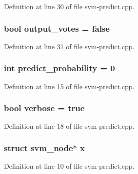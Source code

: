 Definition at line 30 of file svm-\/predict.\-cpp.

\hypertarget{_2svm-predict_8cpp_ac3602f56435c68a322553ed33804e5d1}{
\subsubsection[{output\-\_\-votes}]{\setlength{\rightskip}{0pt plus 5cm}bool output\-\_\-votes = false}}\label{_2svm-predict_8cpp_ac3602f56435c68a322553ed33804e5d1}


Definition at line 31 of file svm-\/predict.\-cpp.

\hypertarget{_2svm-predict_8cpp_a1501132f5226b295e5300d74da55a2b9}{
\subsubsection[{predict\-\_\-probability}]{\setlength{\rightskip}{0pt plus 5cm}int predict\-\_\-probability = 0}}\label{_2svm-predict_8cpp_a1501132f5226b295e5300d74da55a2b9}


Definition at line 15 of file svm-\/predict.\-cpp.

\hypertarget{_2svm-predict_8cpp_ab3f078684998b83967d507d0f453f454}{
\subsubsection[{verbose}]{\setlength{\rightskip}{0pt plus 5cm}bool verbose = true}}\label{_2svm-predict_8cpp_ab3f078684998b83967d507d0f453f454}


Definition at line 18 of file svm-\/predict.\-cpp.

\hypertarget{_2svm-predict_8cpp_a9a5b72a4065074cac5da07efb80a1e79}{
\subsubsection[{x}]{\setlength{\rightskip}{0pt plus 5cm}struct {\bf svm\-\_\-node}$\ast$ x}}\label{_2svm-predict_8cpp_a9a5b72a4065074cac5da07efb80a1e79}


Definition at line 10 of file svm-\/predict.\-cpp.


